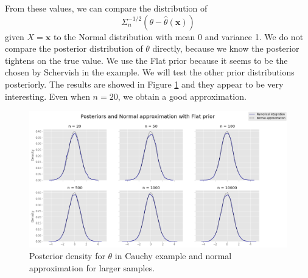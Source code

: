 \documentclass[a4paper,10pt, notitlepage]{report}
\theoremstyle{plain}
\newcommand{\bx}{\boldsymbol{x}} %
\begin{document}
From these values, we can compare the distribution of 
$$
\Sigma_n^{-1/2}(\theta - \hat{\theta}(\bx))
$$
given $X = \bx$ to the Normal distribution with mean 0 and variance 1. We
do not compare the posterior distribution of $\theta$ directly, because we know the
posterior tightens on the true value. We use the Flat prior because it seems to be the chosen by Schervish in the example. We will test the other
prior distributions posteriorly. The results are showed in Figure
\ref{fig:normal-posterior-larger} and they appear to be very interesting.
Even when $n = 20$, we obtain a good approximation. 

\begin{figure}[H]
    \centering
    \includegraphics[width=.85\textwidth]{../../images/normal-approximation-large-sample.png}
    \caption{Posterior density for $\theta$ in Cauchy example and normal approximation for larger samples.}
    \label{fig:normal-posterior-larger}
\end{figure}

\newpage



\end{document}
